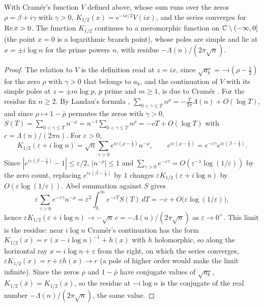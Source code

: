 \begin{proposition}\label{sm:prop:cramer}
With Cram\'er's function $V$ defined above, whose sum runs over the zeros $\rho=\beta+i\gamma$ with $\gamma>0$, $K_{1/2}(x)=e^{-ix/2}V(ix)$, and the series converges for $\operatorname{Re} x>0$. The function $K_{1/2}$ continues to a meromorphic function on $\mathbb{C}\setminus(-\infty,0]$ (the point $x=0$ is a logarithmic branch point), whose poles are simple and lie at $x=\pm i\log n$ for the prime powers $n$, with residue $-\Lambda(n)/(2\pi\sqrt n)$.
\end{proposition}

\begin{proof}
The relation to $V$ is the definition read at $z=ix$, since $\sqrt{a_k}=-i(\rho-\frac12)$ for the zero $\rho$ with $\gamma>0$ that belongs to $a_k$, and the continuation of $V$ with its simple poles at $z=\pm m\log p$, $p$ prime and $m\ge1$, is due to Cram\'er \cite{Cramer19}. For the residue fix $n\ge2$. By Landau's formula \cite{Landau11}, $\sum_{0<\gamma\le T}n^{\rho}=-\frac T{2\pi}\Lambda(n)+O(\log T)$, and since $\rho\mapsto1-\bar\rho$ permutes the zeros with $\gamma>0$, $S(T)=\sum_{0<\gamma\le T}n^{-\rho}=n^{-1}\overline{\sum_{0<\gamma\le T}n^{\rho}}=-cT+O(\log T)$ with $c=\Lambda(n)/(2\pi n)$. For $\varepsilon>0$,
\[
K_{1/2}(\varepsilon+i\log n)=\sqrt n\sum_{\gamma>0}e^{i\varepsilon(\rho-\frac12)}n^{-\rho},\qquad e^{i\varepsilon(\rho-\frac12)}=e^{-\varepsilon\gamma}e^{i\varepsilon(\beta-\frac12)}.
\]
Since $|e^{i\varepsilon(\beta-\frac12)}-1|\le\varepsilon/2$, $|n^{-\rho}|\le1$ and $\sum_{\gamma>0}e^{-\varepsilon\gamma}=O(\varepsilon^{-1}\log(1/\varepsilon))$ by the zero count, replacing $e^{i\varepsilon(\beta-\frac12)}$ by $1$ changes $\varepsilon K_{1/2}(\varepsilon+i\log n)$ by $O(\varepsilon\log(1/\varepsilon))$. Abel summation against $S$ gives
\[
\varepsilon\sum_{\gamma>0}e^{-\varepsilon\gamma}n^{-\rho}=\varepsilon^2\int_0^\infty e^{-\varepsilon T}S(T)\,dT=-c+O\big(\varepsilon\log(1/\varepsilon)\big),
\]
hence $\varepsilon K_{1/2}(\varepsilon+i\log n)\to-\sqrt n\,c=-\Lambda(n)/(2\pi\sqrt n)$ as $\varepsilon\to0^+$. This limit is the residue: near $i\log n$ Cram\'er's continuation has the form $K_{1/2}(x)=r\,(x-i\log n)^{-1}+h(x)$ with $h$ holomorphic, so along the horizontal ray $x=i\log n+\varepsilon$ from the right, on which the series converges, $\varepsilon K_{1/2}(x)=r+\varepsilon h(x)\to r$ (a pole of higher order would make the limit infinite). Since the zeros $\rho$ and $1-\bar\rho$ have conjugate values of $\sqrt{a_k}$, $K_{1/2}(\bar x)=\overline{K_{1/2}(x)}$, so the residue at $-i\log n$ is the conjugate of the real number $-\Lambda(n)/(2\pi\sqrt n)$, the same value.
\end{proof}

